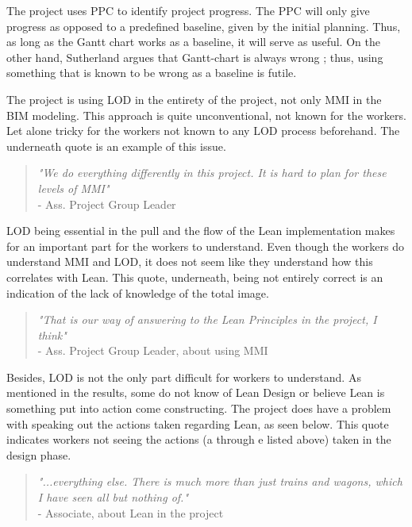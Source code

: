 The project uses PPC to identify project progress. The PPC will only give progress as opposed to a predefined baseline, given by the initial planning. Thus, as long as the Gantt chart works as a baseline, it will serve as useful. On the other hand, Sutherland argues that Gantt-chart is always wrong \cite{sutherland}; thus, using something that is known to be wrong as a baseline is futile.

The project is using LOD in the entirety of the project, not only MMI in the BIM modeling. This approach is quite unconventional, not known for the workers. Let alone tricky for the workers not known to any LOD process beforehand. The underneath quote is an example of this issue. 

\begin{quote}
    \textit{"We do everything differently in this project. It is hard to plan for these levels of MMI"} \\
    - Ass. Project Group Leader
\end{quote}

LOD being essential in the pull and the flow of the Lean implementation makes for an important part for the workers to understand. Even though the workers do understand MMI and LOD, it does not seem like they understand how this correlates with Lean. This quote, underneath, being not entirely correct is an indication of the lack of knowledge of the total image. 

\begin{quote}
    \textit{"That is our way of answering to the Lean Principles in the project, I think"} \\
    - Ass. Project Group Leader, about using MMI
\end{quote}

Besides, LOD is not the only part difficult for workers to understand. As mentioned in the results, some do not know of Lean Design or believe Lean is something put into action come constructing. The project does have a problem with speaking out the actions taken regarding Lean, as seen below. This quote indicates workers not seeing the actions (a through e listed above) taken in the design phase.

\begin{quote}
    \textit{"...everything else. There is much more than just trains and wagons, which I have seen all but nothing of."} \\
    - Associate, about Lean in the project 
\end{quote}


